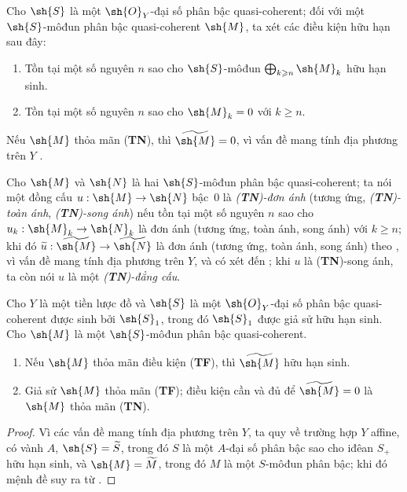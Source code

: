 \documentclass[oneside,10pt]{amsart}
\makeatletter
\renewcommand{\geq}{\geqslant}
\newcommand{\ega@arrow}[2]{\mathchoice{#1}{#2}{#2}{#2}}
\renewcommand{\to}{\ega@arrow{\longrightarrow}{\rightarrow}}
\let\EGAOriginalLabel\label
\renewcommand{\label}[1]{\phantomsection\EGAOriginalLabel{#1}}
\makeatother
\begin{document}
\begin{env}[3.4.2]
\label{II.3.4.2}
Cho $\sh{S}$ là một $\sh{O}_Y$-đại số phân bậc quasi-coherent;
đối với một $\sh{S}$-môđun phân bậc quasi-coherent $\sh{M}$, ta xét các điều kiện hữu hạn sau đây:
\begin{enumerate}
  \item[(\textbf{TF})] Tồn tại một số nguyên $n$ sao cho $\sh{S}$-môđun $\bigoplus_{k\geq n}\sh{M}_k$ hữu hạn sinh.
  \item[(\textbf{TN})] Tồn tại một số nguyên $n$ sao cho $\sh{M}_k=0$ với $k\geq n$.
\end{enumerate}

Nếu $\sh{M}$ thỏa mãn (\textbf{TN}), thì $\widetilde{\sh{M}}=0$, vì vấn đề mang tính địa phương trên $Y$ .

Cho $\sh{M}$ và $\sh{N}$ là hai $\sh{S}$-môđun phân bậc quasi-coherent;
ta nói một đồng cấu $u:\sh{M}\to\sh{N}$ bậc~$0$ là \emph{(\textbf{TN})-đơn ánh} (tương ứng, \emph{(\textbf{TN})-toàn ánh}, \emph{(\textbf{TN})-song ánh}) nếu tồn tại một số nguyên $n$ sao cho $u_k:\sh{M}_k\to\sh{N}_k$ là đơn ánh (tương ứng, toàn ánh, song ánh) với $k\geq n$;
khi đó $\widetilde{u}:\widetilde{\sh{M}}\to\widetilde{\sh{N}}$ là đơn ánh (tương ứng, toàn ánh, song ánh) theo , vì vấn đề mang tính địa phương trên $Y$, và có xét đến ;
khi $u$ là (\textbf{TN})-song ánh, ta còn nói $u$ là một \emph{(\textbf{TN})-đẳng cấu}.
\end{env}

\begin{proposition}[3.4.3]
\label{II.3.4.3}
Cho $Y$ là một tiền lược đồ và $\sh{S}$ là một $\sh{O}_Y$-đại số phân bậc quasi-coherent được sinh bởi $\sh{S}_1$, trong đó $\sh{S}_1$ được giả sử hữu hạn sinh.
Cho $\sh{M}$ là một $\sh{S}$-môđun phân bậc quasi-coherent.
\begin{enumerate}
  \item[(i)] Nếu $\sh{M}$ thỏa mãn điều kiện (\textbf{TF}), thì $\widetilde{\sh{M}}$ hữu hạn sinh.
  \item[(ii)] Giả sử $\sh{M}$ thỏa mãn (\textbf{TF}); điều kiện cần và đủ để $\widetilde{\sh{M}}=0$ là $\sh{M}$ thỏa mãn (\textbf{TN}).
\end{enumerate}
\end{proposition}

\begin{proof}
Vì các vấn đề mang tính địa phương trên $Y$, ta quy về trường hợp $Y$ affine, có vành $A$, $\sh{S}=\widetilde{S}$, trong đó $S$ là một $A$-đại số phân bậc sao cho iđêan $S_+$ hữu hạn sinh, và $\sh{M}=\widetilde{M}$, trong đó $M$ là một $S$-môđun phân bậc;
khi đó mệnh đề suy ra từ .
\end{proof}
\end{document}
